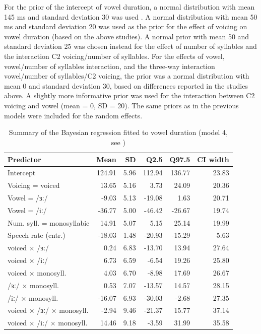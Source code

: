 \documentclass[
  12pt,
  a4paper,
]{article}
\begin{document}
For the prior of the intercept of vowel duration, a normal distribution
with mean 145 ms and standard deviation 30 was used
\citep{heffner1937, house1953, peterson1960, sharf1962, chen1970, klatt1973, davis1989, laeufer1992, ko2018}.
A normal distribution with mean 50 ms and standard deviation 20 was used
as the prior for the effect of voicing on vowel duration (based on the
above studies). A normal prior with mean 50 and standard deviation 25
was chosen instead for the effect of number of syllables and the
interaction C2 voicing/number of syllables. For the effects of vowel,
vowel/number of syllables interaction, and the three-way interaction
vowel/number of syllables/C2 voicing, the prior was a normal
distribution with mean 0 and standard deviation 30, based on differences
reported in the studies above. A slightly more informative prior was
used for the interaction between C2 voicing and vowel (mean = 0, SD =
20). The same priors as in the previous models were included for the
random effects.

\begin{table}[t]

\caption{\label{tab:vow-4-table}Summary of the Bayesian regression fitted to vowel duration (model 4, see )}
\centering
\fontsize{8}{10}\selectfont
\begin{tabular}{lrrrrr}
\toprule
Predictor & Mean & SD & Q2.5 & Q97.5 & CI width\\
\midrule
Intercept & 124.91 & 5.96 & 112.94 & 136.77 & 23.83\\
Voicing = voiced & 13.65 & 5.16 & 3.73 & 24.09 & 20.36\\
Vowel = /ɜː/ & -9.03 & 5.13 & -19.08 & 1.63 & 20.71\\
Vowel = /iː/ & -36.77 & 5.00 & -46.42 & -26.67 & 19.74\\
Num. syll. = monosyllabic & 14.91 & 5.07 & 5.15 & 25.14 & 19.99\\
Speech rate (cntr.) & -18.03 & 1.48 & -20.93 & -15.29 & 5.63\\
voiced × /ɜː/ & 0.24 & 6.83 & -13.70 & 13.94 & 27.64\\
voiced × /iː/ & 6.73 & 6.59 & -6.54 & 19.26 & 25.80\\
voiced × monosyll. & 4.03 & 6.70 & -8.98 & 17.69 & 26.67\\
/ɜː/ × monosyll. & 0.53 & 7.07 & -13.57 & 14.57 & 28.15\\
/iː/ × monosyll. & -16.07 & 6.93 & -30.03 & -2.68 & 27.35\\
voiced × /ɜː/ × monosyll. & -2.94 & 9.46 & -21.37 & 15.77 & 37.14\\
voiced × /iː/ × monosyll. & 14.46 & 9.18 & -3.59 & 31.99 & 35.58\\
\bottomrule
\end{tabular}
\end{table}
\end{document}
